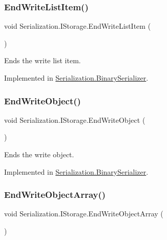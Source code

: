 \subsubsection{\texorpdfstring{End\+Write\+List\+Item()}{EndWriteListItem()}}
{\footnotesize\ttfamily void Serialization.\+I\+Storage.\+End\+Write\+List\+Item (\begin{DoxyParamCaption}{ }\end{DoxyParamCaption})}



Ends the write list item. 



Implemented in \hyperlink{class_serialization_1_1_binary_serializer_aa0099aa23887ecaba8eee43f474fed04}{Serialization.\+Binary\+Serializer}.

\mbox{\label{interface_serialization_1_1_i_storage_a6e6a7469ad14b39e46cd746d4bf3d2ca}} 
\subsubsection{\texorpdfstring{End\+Write\+Object()}{EndWriteObject()}}
{\footnotesize\ttfamily void Serialization.\+I\+Storage.\+End\+Write\+Object (\begin{DoxyParamCaption}{ }\end{DoxyParamCaption})}



Ends the write object. 



Implemented in \hyperlink{class_serialization_1_1_binary_serializer_afa2c3e312cbe5f67a4b963cb0dadaa75}{Serialization.\+Binary\+Serializer}.

\mbox{\label{interface_serialization_1_1_i_storage_a0b6c30b5cb2849e6b9a6e46416867c96}} 
\subsubsection{\texorpdfstring{End\+Write\+Object\+Array()}{EndWriteObjectArray()}}
{\footnotesize\ttfamily void Serialization.\+I\+Storage.\+End\+Write\+Object\+Array (\begin{DoxyParamCaption}{ }\end{DoxyParamCaption})}



